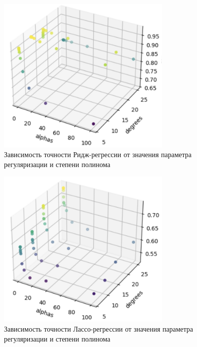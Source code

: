 \begin{figure}
	\begin{center}
		\includegraphics[width=0.75\textwidth]{images/3.png}
	\end{center}
	\caption{Зависимость точности Ридж-регрессии от значения параметра регуляризации и степени полинома}
	\label{img:3}
\end{figure}

\begin{figure}
	\begin{center}
		\includegraphics[width=0.75\textwidth]{images/4.png}
	\end{center}
	\caption{Зависимость точности Лассо-регрессии от значения параметра регуляризации и степени полинома}
	\label{img:4}
\end{figure}

